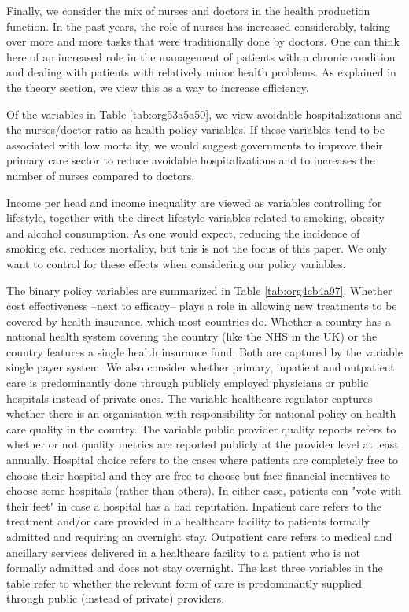 \documentclass[12pt,english,a4paper]{article}
\begin{document}
Finally, we consider the mix of nurses and doctors in the health production function. In the past years, the role of nurses has increased considerably, taking over more and more tasks that were traditionally done by doctors. One can think here of an increased role in the management of patients with a chronic condition and dealing with patients with relatively minor health problems. As explained in the theory section, we view this as a way to increase efficiency.

Of the variables in Table \ref{tab:org53a5a50}, we view avoidable hospitalizations and the nurses/doctor ratio as health policy variables. If these variables tend to be associated with low mortality, we would suggest governments to improve their primary care sector to reduce avoidable hospitalizations and to increases the number of nurses compared to doctors.

Income per head and income inequality are viewed as variables controlling for lifestyle, together with the direct lifestyle variables related to smoking, obesity and alcohol consumption. As one would expect, reducing the incidence of smoking etc. reduces mortality, but this is not the focus of this paper. We only want to control for these effects when considering our policy variables.

The binary policy variables are summarized in Table \ref{tab:org4cb4a97}. Whether cost effectiveness --next to efficacy-- plays a role in allowing new treatments to be covered by health insurance, which most countries do. Whether a country has a national health system covering the country (like the NHS in the UK) or the country features a single health insurance fund. Both are captured by the variable single payer system. We also consider whether primary, inpatient and outpatient care is predominantly done through publicly employed physicians or public hospitals instead of private ones. The variable healthcare regulator captures whether there is an organisation with responsibility for national policy on health care quality in the country. The variable public provider quality reports refers to whether or not quality metrics are reported publicly at the provider level at least annually. Hospital choice refers to the cases where patients are completely free to choose their hospital and they are free to choose but face financial incentives to choose some hospitals (rather than others). In either case, patients can "vote with their feet" in case a hospital has a bad reputation. Inpatient care refers to the treatment and/or care provided in a healthcare facility to patients formally admitted and requiring an overnight stay. Outpatient care refers to medical and ancillary services delivered in a healthcare facility to a patient who is not formally admitted and does not stay overnight. The last three variables in the table refer to whether the relevant form of care is predominantly supplied through public (instead of private) providers.
\end{document}
